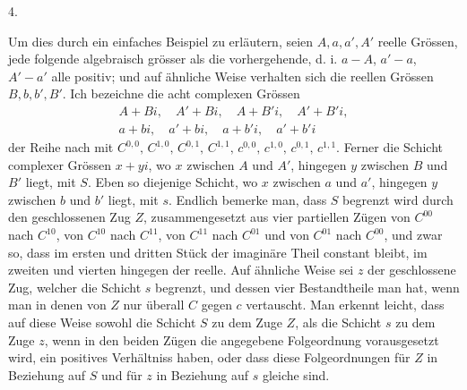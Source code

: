 \begin{center}4.\end{center}
\noindent\hspace*{\parindent}Um dies durch ein einfaches Beispiel zu erläutern, seien \(A,a,a',A'\) reelle Grössen, jede folgende algebraisch grösser als die vorhergehende, d. i. \(a-A\), \(a'-a\), \(A'-a'\) alle positiv; und auf ähnliche Weise verhalten sich die reellen Grössen \(B,b,b',B'\). Ich bezeichne die acht complexen Grössen
\[
\begin{gathered}
A+Bi,\quad A'+Bi,\quad A+B'i,\quad A'+B'i,\\
a+bi,\quad a'+bi,\quad a+b'i,\quad a'+b'i
\end{gathered}
\]
\noindent der Reihe nach mit \(C^{0,0},\,C^{1,0},\,C^{0,1},\,C^{1,1},\,c^{0,0},\,c^{1,0},\,c^{0,1},\,c^{1,1}\). Ferner die Schicht complexer Grössen \(x+yi\), wo \(x\) zwischen \(A\) und \(A'\), hingegen \(y\) zwischen \(B\) und \(B'\) liegt, mit \(S\). Eben so diejenige Schicht, wo \(x\) zwischen \(a\) und \(a'\), hingegen \(y\) zwischen \(b\) und \(b'\) liegt, mit \(s\). Endlich bemerke man, dass \(S\) begrenzt wird durch den geschlossenen Zug \(Z\), zusammengesetzt aus vier partiellen Zügen von \(C^{00}\) nach \(C^{10}\), von \(C^{10}\) nach \(C^{11}\), von \(C^{11}\) nach \(C^{01}\) und von \(C^{01}\) nach \(C^{00}\), und zwar so, dass im ersten und dritten Stück der imaginäre Theil constant bleibt, im zweiten und vierten hingegen der reelle. Auf ähnliche Weise sei \(z\) der geschlossene Zug, welcher die Schicht \(s\) begrenzt, und dessen vier Bestandtheile man hat, wenn man in denen von \(Z\) nur überall \(C\) gegen \(c\) vertauscht. Man erkennt leicht, dass auf diese Weise sowohl die Schicht \(S\)
\clearpage{}
\noindent zu dem Zuge \(Z\), als die Schicht \(s\) zu dem Zuge \(z\), wenn in den beiden Zügen die angegebene Folgeordnung vorausgesetzt wird, ein positives Verhältniss haben, oder dass diese Folgeordnungen für \(Z\) in Beziehung auf \(S\) und für \(z\) in Beziehung auf \(s\) gleiche sind.

